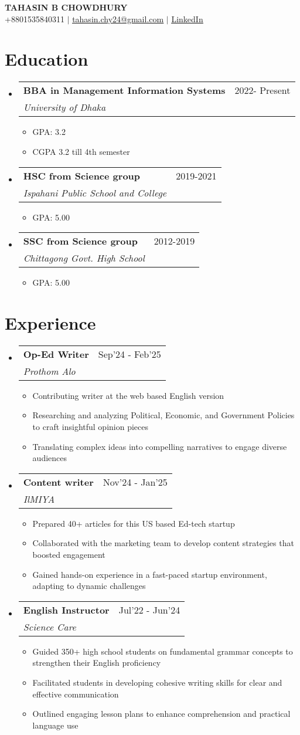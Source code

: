 \documentclass[letterpaper,11pt]{article}
\makeatletter
\newcommand{\resumeItem}[1]{
  \item\small{
    {#1 \vspace{-2pt}}
  }
}
\newcommand{\resumeSubheading}[4]{
  \vspace{-2pt}\item
    \begin{tabular*}{0.97\textwidth}[t]{l@{\extracolsep{\fill}}r}
      \textbf{#1} & #2 \\
      \textit{\small#3} & \textit{\small #4} \\
    \end{tabular*}\vspace{-7pt}
}
\newcommand{\resumeSubHeadingListStart}{\begin{itemize}[leftmargin=0.15in, label={}]}
\newcommand{\resumeSubHeadingListEnd}{\end{itemize}}
\newcommand{\resumeItemListStart}{\begin{itemize}}
\newcommand{\resumeItemListEnd}{\end{itemize}\vspace{-5pt}}
\makeatother
\begin{document}
\begin{center}
    \textbf{\Huge \scshape TAHASIN B CHOWDHURY} \\ \vspace{1pt}
    \small +8801535840311 $|$ \href{mailto:tahasin.chy24@gmail.com}{\underline{tahasin.chy24@gmail.com}} $|$ \href{https://www.linkedin.com/in/tahasin-b-chowdhury/}{\underline{LinkedIn}}
\end{center}

\section{Education}
  \resumeSubHeadingListStart
    \resumeSubheading
      {BBA in Management Information Systems}{2022- Present}
      {University of Dhaka}{}
      \resumeItemListStart
        \resumeItem{GPA: 3.2}
        \resumeItem{CGPA 3.2 till 4th semester}
      \resumeItemListEnd
    \resumeSubheading
      {HSC from Science group}{2019-2021}
      {Ispahani Public School and College}{}
      \resumeItemListStart
        \resumeItem{GPA: 5.00}
      \resumeItemListEnd
    \resumeSubheading
      {SSC from Science group}{2012-2019}
      {Chittagong Govt. High School}{}
      \resumeItemListStart
        \resumeItem{GPA: 5.00}
      \resumeItemListEnd
  \resumeSubHeadingListEnd

\section{Experience}
  \resumeSubHeadingListStart
    \resumeSubheading
      {Op-Ed Writer}{Sep’24 - Feb’25}
      {Prothom Alo}{}
      \resumeItemListStart
        \resumeItem{Contributing writer at the web based English version}
        \resumeItem{Researching and analyzing Political, Economic, and Government Policies to craft insightful opinion pieces}
        \resumeItem{Translating complex ideas into compelling narratives to engage diverse audiences}
      \resumeItemListEnd
    \resumeSubheading
      {Content writer}{Nov’24 - Jan’25}
      {IlMIYA}{}
      \resumeItemListStart
        \resumeItem{Prepared 40+ articles for this US based Ed-tech startup}
        \resumeItem{Collaborated with the marketing team to develop content strategies that boosted engagement}
        \resumeItem{Gained hands-on experience in a fast-paced startup environment, adapting to dynamic challenges}
      \resumeItemListEnd
    \resumeSubheading
      {English Instructor}{Jul’22 - Jun’24}
      {Science Care}{}
      \resumeItemListStart
        \resumeItem{Guided 350+ high school students on fundamental grammar concepts to strengthen their English proficiency}
        \resumeItem{Facilitated students in developing cohesive writing skills for clear and effective communication}
        \resumeItem{Outlined engaging lesson plans to enhance comprehension and practical language use}
      \resumeItemListEnd
  \resumeSubHeadingListEnd
\end{document}
